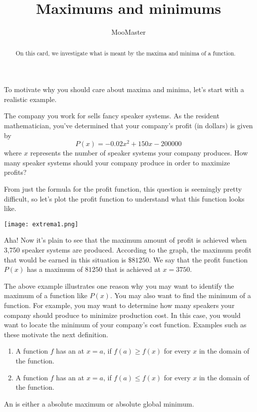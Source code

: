 \documentclass{ximera}
\title[Dig-In]{Maximums and minimums}
\author{MooMaster}
\begin{document}
\begin{abstract}
On this card, we investigate what is meant by the maxima and minima of a function.  
\end{abstract}
\maketitle

To motivate why you should care about maxima and minima, let's start with a realistic example. 

\begin{example}
The company you work for sells fancy speaker systems.  As the resident mathematician, you've determined that your company's profit (in dollars) is given by 
\[ P(x) = -0.02x^2 + 150x-200000 \]
where $x$ represents the number of speaker systems your company produces.  How many speaker systems should your company produce in order to maximize profits? 
\begin{explanation}
From just the formula for the profit function, this question is seemingly pretty difficult, so let's plot the profit function to understand what this function looks like.  

\begin{center} \texttt{[image: extrema1.png]} \end{center}

\underline{\hspace{5in}}

Aha!  Now it's plain to see that the maximum amount of profit is achieved when 3,750 speaker systems are produced.  According to the graph, the maximum profit that would be earned in this situation is $\$81250$.  We say that the profit function $P(x)$ has a maximum of $81250$ that is achieved at $x=3750$.  

\end{explanation}
\end{example}

The above example illustrates one reason why you may want to identify the maximum of a function like $P(x)$.  You may also want to find the minimum of a function.  For example, you may want to determine how many speakers your company should produce to minimize production cost.  In this case, you would want to locate the minimum of your company's cost function.  Examples such as these motivate the next definition. 

\begin{definition}\hfil{}
\begin{enumerate}
\item A function $f$ has an  at $x=a$, if $f(a)\ge
  f(x)$ for every $x$ in the domain of the function.
\item A function $f$ has an  at $x=a$, if $f(a)\le
  f(x)$ for every $x$ in the domain of the function.
\end{enumerate} 
An  is either a
absolute maximum or absolute global minimum.  
\end{definition}
\end{document}
